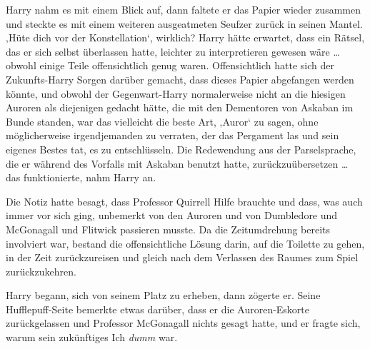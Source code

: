 Harry nahm es mit einem Blick auf, dann faltete er das Papier wieder zusammen und steckte es mit einem weiteren ausgeatmeten Seufzer zurück in seinen Mantel.
‚Hüte dich vor der Konstellation‘, wirklich? Harry hätte erwartet, dass ein Rätsel, das er sich selbst überlassen hatte, leichter zu interpretieren gewesen wäre … obwohl einige Teile offensichtlich genug waren. Offensichtlich hatte sich der Zukunfts-Harry Sorgen darüber gemacht, dass dieses Papier abgefangen werden könnte, und obwohl der Gegenwart-Harry normalerweise nicht an die hiesigen Auroren als diejenigen gedacht hätte, die mit den Dementoren von Askaban im Bunde standen, war das vielleicht die beste Art, ‚Auror‘ zu sagen, ohne möglicherweise irgendjemanden zu verraten, der das Pergament las und sein eigenes Bestes tat, es zu entschlüsseln. Die Redewendung aus der Parselsprache, die er während des Vorfalls mit Askaban benutzt hatte, zurückzuübersetzen … das funktionierte, nahm Harry an.

Die Notiz hatte besagt, dass Professor Quirrell Hilfe brauchte und dass, was auch immer vor sich ging, unbemerkt von den Auroren und von Dumbledore und McGonagall und Flitwick passieren musste. Da die Zeitumdrehung bereits involviert war, bestand die offensichtliche Lösung darin, auf die Toilette zu gehen, in der Zeit zurückzureisen und gleich nach dem Verlassen des Raumes zum Spiel zurückzukehren.

Harry begann, sich von seinem Platz zu erheben, dann zögerte er. Seine Hufflepuff-Seite bemerkte etwas darüber, dass er die Auroren-Eskorte zurückgelassen und Professor McGonagall nichts gesagt hatte, und er fragte sich, warum sein zukünftiges Ich \emph{dumm} war.

